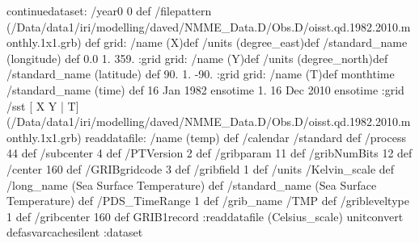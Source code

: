 \begin{ingrid}
continuedataset:
 /year0 0 def
 /filepattern (/Data/data1/iri/modelling/daved/NMME_Data.D/Obs.D/oisst.qd.1982.2010.monthly.1x1.grb) def
grid:
/name (X)def
/units (degree_east)def
/standard_name (longitude) def
 0.0 1. 359.
:grid
grid:
/name (Y)def
/units (degree_north)def
/standard_name (latitude) def
 90. 1. -90.
:grid
grid:
/name (T)def
monthtime
/standard_name (time) def
16 Jan 1982 ensotime
1.
16 Dec 2010 ensotime
:grid
 /sst{
[ X Y | T] 
(/Data/data1/iri/modelling/daved/NMME_Data.D/Obs.D/oisst.qd.1982.2010.monthly.1x1.grb)
readdatafile:
/name (temp) def
 /calendar /standard def
 /process 44 def
 /subcenter 4 def
 /PTVersion 2 def
 /gribparam 11 def
 /gribNumBits 12 def
 /center 160 def
 /GRIBgridcode 3 def
 /gribfield 1 def
 /units /Kelvin_scale def
 /long_name (Sea Surface Temperature) def
/standard_name (Sea Surface Temperature) def
 /PDS_TimeRange 1 def
 /grib_name /TMP def
 /gribleveltype 1 def
 /gribcenter 160 def
GRIB1record
 :readdatafile
(Celsius_scale) unitconvert
}defasvarcachesilent
:dataset
\end{ingrid}
